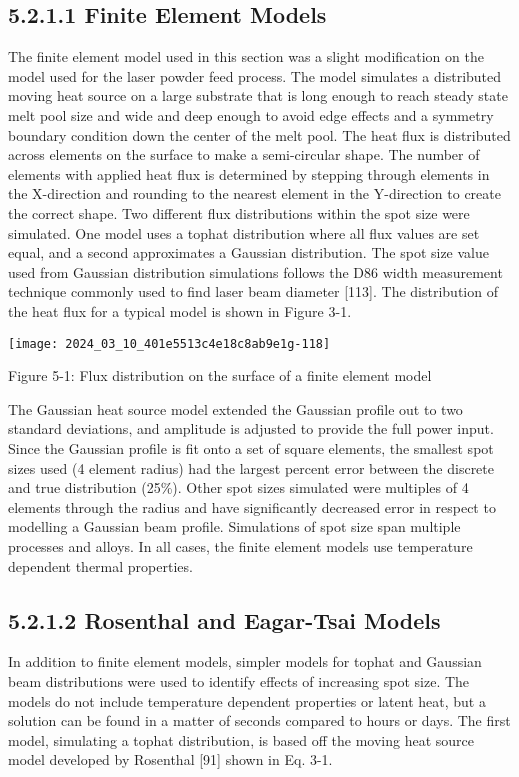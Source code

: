 \documentclass[10pt]{article}
\begin{document}
\subsection*{5.2.1.1 Finite Element Models}
The finite element model used in this section was a slight modification on the model used for the laser powder feed process. The model simulates a distributed moving heat source on a large substrate that is long enough to reach steady state melt pool size and wide and deep enough to avoid edge effects and a symmetry boundary condition down the center of the melt pool. The heat flux is distributed across elements on the surface to make a semi-circular shape. The number of elements with applied heat flux is determined by stepping through elements in the X-direction and rounding to the nearest element in the Y-direction to create the correct shape. Two different flux distributions within the spot size were simulated. One model uses a tophat distribution where all flux values are set equal, and a second approximates a Gaussian distribution. The spot size value used from Gaussian distribution simulations follows the D86 width measurement technique commonly used to find laser beam diameter [113]. The distribution of the heat flux for a typical model is shown in Figure 3-1.

\begin{center}
\texttt{[image: 2024\_03\_10\_401e5513c4e18c8ab9e1g-118]}
\end{center}

Figure 5-1: Flux distribution on the surface of a finite element model

The Gaussian heat source model extended the Gaussian profile out to two standard deviations, and amplitude is adjusted to provide the full power input. Since the Gaussian profile is fit onto a set of square elements, the smallest spot sizes used (4 element radius) had the largest percent error between the discrete and true distribution (25\%). Other spot sizes simulated were multiples of 4 elements through the radius and have significantly decreased error in respect to modelling a Gaussian beam profile. Simulations of spot size span multiple processes and alloys. In all cases, the finite element models use temperature dependent thermal properties.

\subsection*{5.2.1.2 Rosenthal and Eagar-Tsai Models}
In addition to finite element models, simpler models for tophat and Gaussian beam distributions were used to identify effects of increasing spot size. The models do not include temperature dependent properties or latent heat, but a solution can be found in a matter of seconds compared to hours or days. The first model, simulating a tophat distribution, is based off the moving heat source model developed by Rosenthal [91] shown in Eq. 3-1.
\end{document}
